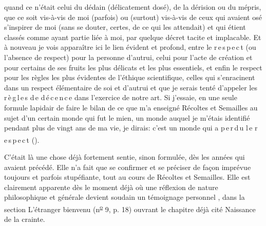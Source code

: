 quand ce n'était celui du dédain (délicatement dosé), de la dérision ou du mépris, que ce soit vis-à-vis de moi (parfois) ou (surtout) vis-à-vis de ceux qui avaient osé s'inspirer de moi (sans se douter, certes, de ce qui les attendait) et qui étient classés comme ayant partie liée à moi, par quelque décret tacite et implacable. Et à nouveau je vois apparaître ici le lien évident et profond, entre le \mbox{r\,e\,s\,p\,e\,c\,t} (ou l'absence de respect) pour la personne d'autrui, celui pour l'acte de création et pour certains de ses fruits  les plus délicats et les plus essentiels, et enfin le respect pour les règles les plus évidentes de l'éthique scientifique, celles qui s'enracinent dans un respect élémentaire de soi et d'autrui et que je serais tenté d'appeler les \mbox{r\,è\,g\,l\,e\,s} \mbox{d\,e} \mbox{d\,é\,c\,e\,n\,c\,e} dans l'exercice de notre art.  Si j'essaie, en une seule formule lapidair de faire le bilan de ce que m'a enseigné Récoltes et Semailles au sujet d'un certain monde qui fut le mien, un monde auquel je m'étais identifié pendant plus de vingt ans de ma vie, je dirais: c'est un monde qui a \mbox{p\,e\,r\,d\,u} \mbox{l\,e} \mbox{r\,e\,s\,p\,e\,c\,t} (\textsuperscript{}).

C'était là une chose déjà fortement sentie, sinon formulée, dès les années qui avaient précédé. Elle n'a fait que se confirmer et se préciser\handwritten{,} de façon  imprévue toujours et parfois stupéfiante, tout au cours de Récoltes et Semailles. Elle est clairement apparente dès le moment\unsure{,} déjà où une réflexion de nature philosophique et générale devient soudain un témoignage personnel , dans la section L'étranger bienvenu (n\textsuperscript{\uline{o}} 9, p. 18) ouvrant le chapitre déjà cité Naissance de la crainte\deleted{\unsure{)}}.

